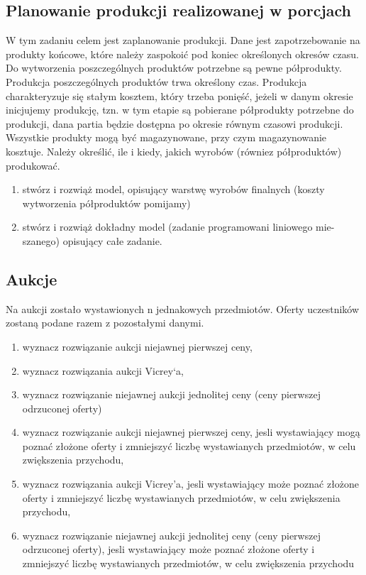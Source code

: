 \documentclass[
    12pt, %
]{../fphw}
\begin{document}
\subsection{Planowanie produkcji realizowanej w porcjach}
W tym zadaniu celem jest zaplanowanie produkcji. Dane jest zapotrzebowanie na produkty końcowe,
które należy zaspokoić pod koniec określonych okresów czasu. Do wytworzenia poszczególnych produktów potrzebne
są pewne półprodukty. Produkcja poszczególnych produktów trwa określony czas.
Produkcja charakteryzuje się stałym kosztem, który trzeba ponięść,
jeżeli w danym okresie inicjujemy produkcję, tzn. w tym etapie są pobierane
półprodukty potrzebne do produkcji, dana partia będzie dostępna po okresie
równym czasowi produkcji. Wszystkie produkty mogą być magazynowane,
przy czym magazynowanie kosztuje.
Należy określić, ile i kiedy, jakich wyrobów (równiez półproduktów) produkować.

\begin{enumerate}
    \item stwórz i rozwiąż model, opisujący warstwę wyrobów finalnych (koszty
          wytworzenia półproduktów pomijamy)
    \item stwórz i rozwiąż dokładny model (zadanie programowani liniowego mie-
          szanego) opisujący całe zadanie.
\end{enumerate}

\subsection{Aukcje}
Na aukcji zostało wystawionych n jednakowych przedmiotów. Oferty uczestników zostaną podane razem z pozostałymi danymi.

\begin{enumerate}
    \item \label{51} wyznacz rozwiązanie aukcji niejawnej pierwszej ceny,
    \item \label{52} wyznacz rozwiązania aukcji Vicrey`a,
    \item \label{53} wyznacz rozwiązanie niejawnej aukcji jednolitej ceny (ceny pierwszej
          odrzuconej oferty)
    \item \label{54} wyznacz rozwiązanie aukcji niejawnej pierwszej ceny,
          jesli wystawiający mogą poznać złożone oferty i zmniejszyć liczbę wystawianych
          przedmiotów, w celu zwiększenia przychodu,
    \item \label{55} wyznacz rozwiązania aukcji Vicrey’a, jesli wystawiający może poznać
          złożone oferty i zmniejszyć liczbę wystawianych przedmiotów, w celu
          zwiększenia przychodu,
    \item \label{56} wyznacz rozwiązanie niejawnej aukcji jednolitej ceny (ceny pierwszej
          odrzuconej oferty), jesli wystawiający może poznać złożone oferty i
          zmniejszyć liczbę wystawianych przedmiotów, w celu zwiększenia przychodu
\end{enumerate}
\newpage
\end{document}

